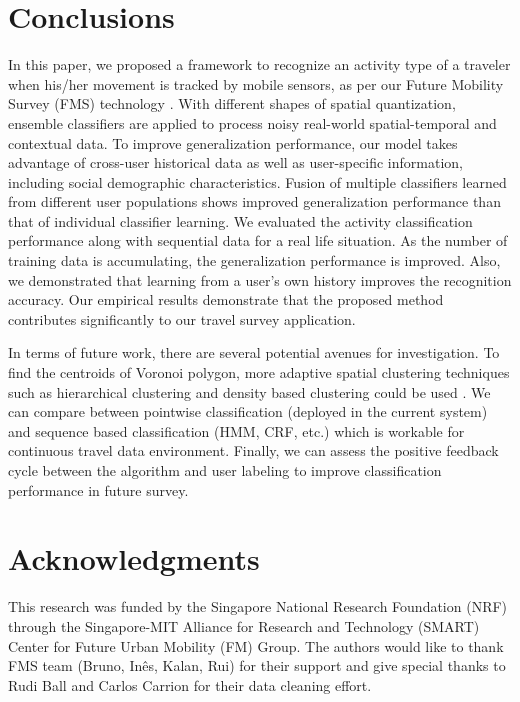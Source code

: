 \documentclass{sig-alternate}
\begin{document}
\section{Conclusions}
In this paper, we proposed a framework to recognize an activity type of a traveler when his/her movement is tracked by mobile sensors, as per our Future Mobility Survey (FMS) technology \cite{Cottrill2013FMS}. With different shapes of spatial quantization, ensemble classifiers are applied to process noisy real-world spatial-temporal and contextual data.
To improve generalization performance, our model takes advantage of cross-user historical data as well as user-specific information, including social demographic characteristics. Fusion of multiple classifiers learned from different user populations shows improved generalization performance than that of individual classifier learning. We evaluated the activity classification performance along with sequential data for a real life situation. As the number of training data is accumulating, the generalization performance is improved. Also, we demonstrated that learning from a user's own history improves the recognition accuracy. Our empirical results demonstrate that the proposed method contributes significantly to our travel survey application.

In terms of future work, there are several potential avenues for investigation. To find the centroids of Voronoi polygon, more adaptive spatial clustering techniques such as hierarchical clustering and density based clustering could be used \cite{Liu2010mobilityclustering,Kisilevich2010spatialtemporalclsutering}. We can compare between pointwise classification (deployed in the current system) and sequence based classification (HMM, CRF, etc.) which is workable for continuous travel data environment. Finally, we can assess the positive feedback cycle between the algorithm and user labeling to improve classification performance in future survey.








\section{Acknowledgments}
This research was funded by the Singapore National Research Foundation (NRF) through the Singapore-MIT Alliance for Research and Technology (SMART) Center for Future Urban Mobility (FM) Group. The authors would like to thank FMS team (Bruno, In\^{e}s, Kalan, Rui) for their support and give special thanks to Rudi Ball and Carlos Carrion for their data cleaning effort.



\end{document}
